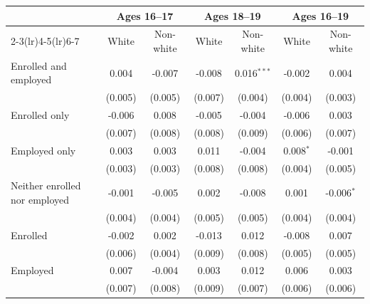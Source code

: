 \begin{tabular}{lcccccc}
\toprule
 & \multicolumn{2}{c}{Ages 16--17} & \multicolumn{2}{c}{Ages 18--19} & \multicolumn{2}{c}{Ages 16--19} \\
\cmidrule(lr){2-3}\cmidrule(lr){4-5}\cmidrule(lr){6-7}
 & White & Non-white & White & Non-white & White & Non-white \\
\midrule
Enrolled and employed & 0.004 & -0.007 & -0.008 & 0.016$^{***}$ & -0.002 & 0.004 \\
 & (0.005) & (0.005) & (0.007) & (0.004) & (0.004) & (0.003) \\
Enrolled only & -0.006 & 0.008 & -0.005 & -0.004 & -0.006 & 0.003 \\
 & (0.007) & (0.008) & (0.008) & (0.009) & (0.006) & (0.007) \\
Employed only & 0.003 & 0.003 & 0.011 & -0.004 & 0.008$^{*}$ & -0.001 \\
 & (0.003) & (0.003) & (0.008) & (0.008) & (0.004) & (0.005) \\
Neither enrolled nor employed & -0.001 & -0.005 & 0.002 & -0.008 & 0.001 & -0.006$^{*}$ \\
 & (0.004) & (0.004) & (0.005) & (0.005) & (0.004) & (0.004) \\
Enrolled & -0.002 & 0.002 & -0.013 & 0.012 & -0.008 & 0.007 \\
 & (0.006) & (0.004) & (0.009) & (0.008) & (0.005) & (0.005) \\
Employed & 0.007 & -0.004 & 0.003 & 0.012 & 0.006 & 0.003 \\
 & (0.007) & (0.008) & (0.009) & (0.007) & (0.006) & (0.006) \\
\bottomrule
\end{tabular}
